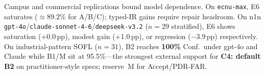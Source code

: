 Campus and commercial replications bound model dependence.
On \texttt{ecnu-max}, E6 saturates (${\approx}89.2\%$ for A/B/C); typed-IR
gains require repair headroom.
On n1n \texttt{gpt-4o}/\texttt{claude-sonnet-4-6}/\texttt{deepseek-v3.2}
($n{=}29$ stratified), E6 shows saturation (+0.0\,pp), modest gain (+1.0\,pp),
or regression ($-$3.9\,pp) respectively.
On industrial-pattern SOFL ($n{=}31$), B2 reaches \textbf{100\%} Conf.\ under
gpt-4o and Claude while B1/M sit at 95.5\%---the strongest external support for
\textbf{C4: default B2} on practitioner-style specs; reserve~M for Accept/PDR-FAR.
